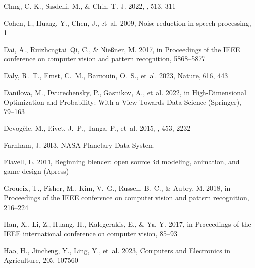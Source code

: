 \begin{thebibliography}{74}
{Chng}, C.-K., {Sasdelli}, M., \& {Chin}, T.-J. 2022, \mnras, 513, 311

Cohen, I., Huang, Y., Chen, J., {et~al.} 2009, Noise reduction in speech processing, 1

Dai, A., Ruizhongtai~Qi, C., \& Nie{\ss}ner, M. 2017, in Proceedings of the IEEE conference on computer vision and pattern recognition, 5868--5877

Daly, R.~T., Ernst, C.~M., Barnouin, O.~S., {et~al.} 2023, Nature, 616, 443

Danilova, M., Dvurechensky, P., Gasnikov, A., {et~al.} 2022, in High-Dimensional Optimization and Probability: With a View Towards Data Science (Springer), 79--163

{Devog{\`e}le}, M., {Rivet}, J.~P., {Tanga}, P., {et~al.} 2015, \mnras, 453, 2232

Farnham, J. 2013, NASA Planetary Data System

Flavell, L. 2011, Beginning blender: open source 3d modeling, animation, and game design (Apress)

Groueix, T., Fisher, M., Kim, V.~G., Russell, B.~C., \& Aubry, M. 2018, in Proceedings of the IEEE conference on computer vision and pattern recognition, 216--224

Han, X., Li, Z., Huang, H., Kalogerakis, E., \& Yu, Y. 2017, in Proceedings of the IEEE international conference on computer vision, 85--93

Hao, H., Jincheng, Y., Ling, Y., {et~al.} 2023, Computers and Electronics in Agriculture, 205, 107560


\end{thebibliography}
